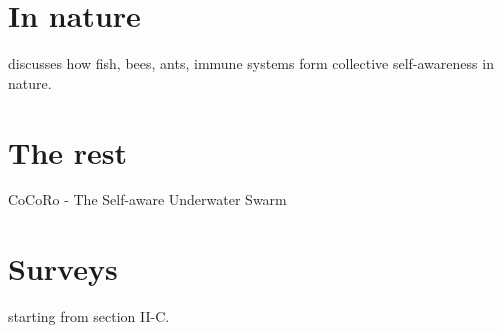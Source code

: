 \documentclass{article}
\begin{document}
	\section{In nature}
	\citet{mitchell-2005-self-awareness-and-control-in-decentralized-systems} discusses how fish, bees, ants, immune systems form collective self-awareness in nature. 	
	
	\section{The rest}
	\cite{kernbach-2011-awareness-and-self-awareness-for-multi-robot-organisms}
	 
	CoCoRo - The Self-aware Underwater Swarm \cite{schmickl-2011-cocoro-the-self-aware-underwater-swarm}
	\section{Surveys}
	\cite{lewis-2011-a-survey-of-self-awareness-and-its-application-in-computing-systems} starting from section II-C.
	
\end{document}
